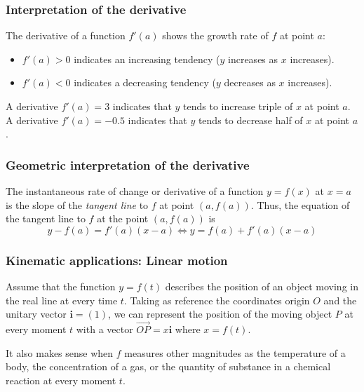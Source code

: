 \begin{frame}
\frametitle{Interpretation of the derivative}
The derivative of a function $f'(a)$ shows the growth rate of $f$ at point $a$:
\begin{itemize}
\item $f'(a)>0$ indicates an increasing tendency ($y$ increases as $x$ increases).
\item $f'(a)<0$ indicates a decreasing tendency ($y$ decreases as $x$ increases).
\end{itemize}

 A derivative $f'(a)=3$ indicates that $y$ tends to increase triple of $x$ at point $a$. 
 A derivative $f'(a)=-0.5$ indicates that $y$ tends to decrease half of $x$ at point $a$. 
\end{frame}


\begin{frame}
\frametitle{Geometric interpretation of the derivative}

The instantaneous rate of change or derivative of a function $y=f(x)$ at $x=a$ is the slope of the \emph{tangent line} to $f$ at point $(a,f(a))$. 
Thus, the equation of the tangent line to $f$ at the point $(a,f(a))$ is
\[
y-f(a) = f'(a)(x-a) \Leftrightarrow y = f(a)+f'(a)(x-a)
\]
\begin{center}

\end{center}
\end{frame}


\begin{frame}
\frametitle{Kinematic applications: Linear motion}
Assume that the function $y=f(t)$ describes the position of an object moving in the real line at every time $t$.
Taking as reference the coordinates origin $O$ and the unitary vector $\mathbf{i}=(1)$, we can represent the position of the moving object $P$ at every moment $t$ with a vector $\vec{OP}=x\mathbf{i}$ where $x=f(t)$.
\begin{center}

\end{center}

 It also makes sense when $f$ measures other magnitudes as the temperature of a body, the concentration of a gas, or the quantity of substance in a chemical reaction at every moment $t$.
\end{frame}


